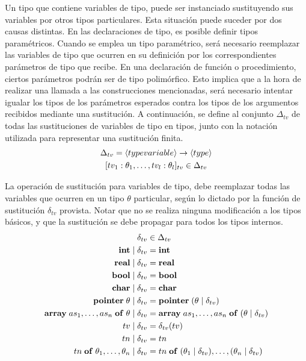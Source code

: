 Un tipo que contiene variables de tipo, puede ser instanciado sustituyendo sus variables por otros tipos particulares.
Esta situación puede suceder por dos causas distintas.
En las declaraciones de tipo, es posible definir tipos paramétricos.
Cuando se emplea un tipo paramétrico, será necesario reemplazar las variables de tipo que ocurren en su definición por los correspondientes parámetros de tipo que recibe.
En una declaración de función o procedimiento, ciertos parámetros podrán ser de tipo polimórfico.
Esto implica que a la hora de realizar una llamada a las construcciones mencionadas, será necesario intentar igualar los tipos de los parámetros esperados contra los tipos de los argumentos recibidos mediante una sustitución.
A continuación, se define al conjunto $\Delta_{tv}$ de todas las sustituciones de variables de tipo en tipos, junto con la notación utilizada para representar una sustitución finita.
\begin{gather*}
\Delta_{tv} = \langle typevariable \rangle \rightarrow \langle type \rangle
\\
[tv_1 : \theta_1, \ldots, tv_l : \theta_l]_{tv} \in \Delta_{tv}
\end{gather*}

La operación de sustitución para variables de tipo, debe reemplazar todas las variables que ocurren en un tipo $\theta$ particular, según lo dictado por la función de sustitución $\delta_{tv}$ provista.
Notar que no se realiza ninguna modificación a los tipos básicos, y que la sustitución se debe propagar para todos los tipos internos.
\begin{align*}
\delta_{tv}
&\in
\Delta_{tv}
\\
\mathbf{int} \mid \delta_{tv}
&=
\mathbf{int}
\\
\mathbf{real} \mid \delta_{tv}
&=
\mathbf{real}
\\
\mathbf{bool} \mid \delta_{tv}
&=
\mathbf{bool}
\\
\mathbf{char} \mid \delta_{tv}
&=
\mathbf{char}
\\
\mathbf{pointer} \; \theta \mid \delta_{tv}
&=
\mathbf{pointer} \; (\theta \mid \delta_{tv})
\\
\mathbf{array} \; as_1, \ldots, as_n \; \mathbf{of} \; \theta \mid \delta_{tv}
&=
\mathbf{array} \; as_1, \ldots, as_n \; \mathbf{of} \; (\theta \mid \delta_{tv})
\\
tv \mid \delta_{tv}
&=
\delta_{tv}(tv)
\\
tn \mid \delta_{tv}
&=
tn
\\
tn \; \mathbf{of} \; \theta_1, \ldots, \theta_n \mid \delta_{tv}
&=
tn \; \mathbf{of} \; (\theta_1 \mid \delta_{tv}), \ldots, (\theta_n \mid \delta_{tv})
\end{align*}

